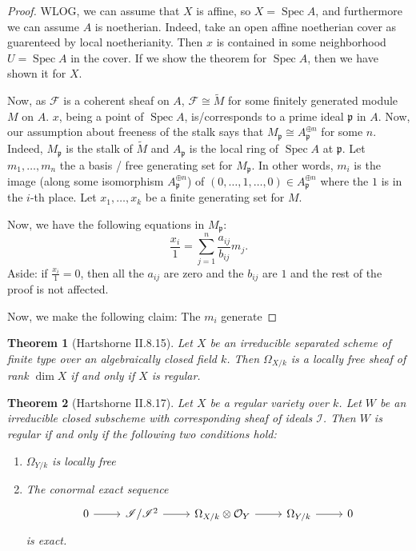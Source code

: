 \documentclass[a4paper]{article}
\newtheorem{thm}{Theorem}[section]
\newcommand{\isom}{\cong}
\newcommand{\Spec}{\operatorname{Spec}}
\newcommand{\conormal}{\mathscr{I} / \mathscr{I}^{2}}
\begin{document}
\begin{proof}
	WLOG, we can assume that \(X\) is affine, so 
	\(X = \Spec A\), and furthermore we can assume
	\(A\) is noetherian.
	Indeed, take an open affine noetherian cover 
	as guarenteed by local noetherianity. 
	Then \(x\) is contained in some neighborhood
	\(U = \Spec A\) in the cover. 
	If we show the theorem for \(\Spec A\),
	then we have shown it for \(X\).

	Now, as \(\mathcal{F}\) is a coherent sheaf on 
	\(A\), \(\mathcal{F} \isom \tilde{M}\) for some
	finitely generated module \(M\) on \(A\).
	\(x\), being a point of \(\Spec A\), 
	is/corresponds to a prime
	ideal \(\mathfrak{p}\) in \(A\).
	Now, our assumption about
	freeness of the stalk says that
	\(M_{\mathfrak{p}} \isom A_{\mathfrak{p}}^{\oplus n}\) 
	for some \(n\).
	Indeed, \(M_{\mathfrak{p}}\) is the stalk of 
	\(\tilde{M}\) and \(A_{\mathfrak{p}}\) is the local
	ring of \(\Spec A\) at \(\mathfrak{p}\).
	Let \(m_{1} , \ldots , m_{n}\) the a 
	basis / free generating set for \(M_{\mathfrak{p}}\).
	In other words, \(m_{i}\) is the image 
	(along
	some isomorphism \(A_{\mathfrak{p}}^{\oplus n}\)) of
	\((0, \ldots, 1, \ldots, 0) \in A_{\mathfrak{p}}^{\oplus n}\)
	where the \(1\) is in the \(i\)-th place.
	Let \(x_{1}, \ldots, x_{k}\) be a finite generating set
	for \(M\).
	
	Now, we have the following equations in \(M_{\mathfrak{p}}\):
	\[
		\frac{x_{i}}{1} = \sum_{j=1}^{n} \frac{a_{ij}}{b_{ij}} m_{j} 
	.\] 
	Aside: if \(\frac{x_{i}}{1} = 0\), then all the \(a_{ij}\) are zero
	and the \(b_{ij}\) are \(1\) and the rest of the proof is
	not affected.

	Now, we make the following claim: 
	The \(m_{i}\) generate 
	


\end{proof}


\begin{thm}
	[Hartshorne II.8.15]
	Let \(X\) be an irreducible separated scheme of finite type 
	over an algebraically closed field \(k\).
	Then \(\Omega_{X / k}\) is a locally free
	sheaf of rank \(\dim X\) if and only if 
	\(X\) is regular.
\end{thm}


\begin{thm}
	[Hartshorne II.8.17]
	Let \(X\) be a regular variety over \(k\).
	Let \(W\) be an irreducible closed subscheme 
	with corresponding sheaf of ideals \(\mathscr{I}\).
	Then \(W\) is regular if and only if the following
	two conditions hold:
	\begin{enumerate}[(1)]
		\item \(\Omega_{Y / k}\) is locally free
		\item The conormal exact sequence
			\[
			\begin{tikzcd}
			0 \arrow{r}{} & \conormal \arrow{r}{} & 
			\Omega_{X / k} \otimes \mathcal{O}_{Y}  \arrow{r}{} & 
			\Omega_{Y / k} \arrow{r}{} & 0
			\end{tikzcd}
			\]
			is exact.
	\end{enumerate}
\end{thm}
\end{document}
